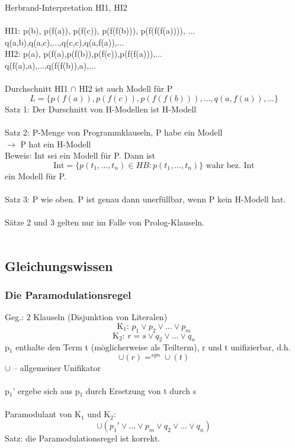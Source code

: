 \documentclass[a4paper,14pt]{article}
\begin{document}

Herbrand-Interpretation HI1, HI2\\
\\
HI1: p(b), p(f(a)), p(f(c)), p(f(f(b))), p(f(f(f(a)))), $\dots$\\
q(a,b),q(a,c),$\dots$,q(c,c),q(a,f(a)),$\dots$\\
HI2: p(a), p(f(a),p(f(b)),p(f(c)),p(f(f(a))),$\dots$\\
q(f(a),a),$\dots$,q(f(f(b)),a),$\dots$\\
\\
Durchschnitt HI1 $\cap$ HI2 ist auch Modell für P
$$L=\{p(f(a)),p(f(c)),p(f(f(b))),\dots,q(a,f(a)),\dots\}$$
Satz 1: Der Durschnitt von H-Modellen ist H-Modell\\
\\
Satz 2: P-Menge von Programmklauseln, P habe ein Modell\\
$\rightarrow$ P hat ein H-Modell\\
Beweis: Int sei ein Modell für P. Dann ist
$$\text{Int} = \{p(t_1,\dots,t_n)\in HB: p(t_1,\dots,t_n)\}\text{ wahr bez. Int}$$
ein Modell für P.\\
\\
Satz 3: P wie oben. P ist genau dann unerfüllbar, wenn P kein H-Modell hat.\\
\\
Sätze 2 und 3 gelten nur im Falle von Prolog-Klauseln.\\
\\

\subsection{Gleichungswissen}
\subsubsection{Die Paramodulationsregel}
Geg.: 2 Klauseln (Disjunktion von Literalen)\\
$$\text{K}_1\text{:  }p_1\vee p_2\vee \dots \vee p_m$$
$$\text{K}_2\text{:  }r=s \vee q_2 \vee \dots \vee q_n$$
p$_1$ enthalte den Term t (möglicherweise als Teilterm), r und t unifizierbar, d.h.
$$\cup(r)=^{syn}\cup(t)$$
$\cup$ -- allgemeiner Unifikator\\
\\
p$_1$' ergebe sich aus p$_1$ durch Ersetzung von t durch s\\
\\
Paramodulant von K$_1$ und K$_2$:
$$\cup(p_1'\vee \dots \vee p_m \vee q_2 \vee \dots \vee q_n)$$
Satz: die Paramodulationsregel ist korrekt.
\end{document}
